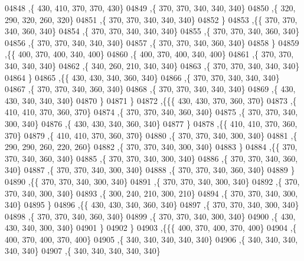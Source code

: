 \begin{DoxyCode}
04848     ,\{   430,   410,   370,   370,   430\}
04849     ,\{   370,   370,   340,   340,   340\}
04850     ,\{   320,   290,   320,   260,   320\}
04851     ,\{   370,   370,   340,   340,   340\}
04852     \}
04853    ,\{\{   370,   370,   340,   360,   340\}
04854     ,\{   370,   370,   340,   340,   340\}
04855     ,\{   370,   370,   340,   360,   340\}
04856     ,\{   370,   370,   340,   340,   340\}
04857     ,\{   370,   370,   340,   360,   340\}
04858     \}
04859    ,\{\{   400,   370,   400,   340,   400\}
04860     ,\{   400,   370,   400,   340,   400\}
04861     ,\{   370,   370,   340,   340,   340\}
04862     ,\{   340,   260,   210,   340,   340\}
04863     ,\{   370,   370,   340,   340,   340\}
04864     \}
04865    ,\{\{   430,   430,   340,   360,   340\}
04866     ,\{   370,   370,   340,   340,   340\}
04867     ,\{   370,   370,   340,   360,   340\}
04868     ,\{   370,   370,   340,   340,   340\}
04869     ,\{   430,   430,   340,   340,   340\}
04870     \}
04871    \}
04872   ,\{\{\{   430,   430,   370,   360,   370\}
04873     ,\{   410,   410,   370,   360,   370\}
04874     ,\{   370,   370,   340,   360,   340\}
04875     ,\{   370,   370,   340,   300,   340\}
04876     ,\{   430,   430,   340,   360,   340\}
04877     \}
04878    ,\{\{   410,   410,   370,   360,   370\}
04879     ,\{   410,   410,   370,   360,   370\}
04880     ,\{   370,   370,   340,   300,   340\}
04881     ,\{   290,   290,   260,   220,   260\}
04882     ,\{   370,   370,   340,   300,   340\}
04883     \}
04884    ,\{\{   370,   370,   340,   360,   340\}
04885     ,\{   370,   370,   340,   300,   340\}
04886     ,\{   370,   370,   340,   360,   340\}
04887     ,\{   370,   370,   340,   300,   340\}
04888     ,\{   370,   370,   340,   360,   340\}
04889     \}
04890    ,\{\{   370,   370,   340,   300,   340\}
04891     ,\{   370,   370,   340,   300,   340\}
04892     ,\{   370,   370,   340,   300,   340\}
04893     ,\{   300,   240,   210,   300,   210\}
04894     ,\{   370,   370,   340,   300,   340\}
04895     \}
04896    ,\{\{   430,   430,   340,   360,   340\}
04897     ,\{   370,   370,   340,   300,   340\}
04898     ,\{   370,   370,   340,   360,   340\}
04899     ,\{   370,   370,   340,   300,   340\}
04900     ,\{   430,   430,   340,   300,   340\}
04901     \}
04902    \}
04903   ,\{\{\{   400,   370,   400,   370,   400\}
04904     ,\{   400,   370,   400,   370,   400\}
04905     ,\{   340,   340,   340,   340,   340\}
04906     ,\{   340,   340,   340,   340,   340\}
04907     ,\{   340,   340,   340,   340,   340\}

\end{DoxyCode}
